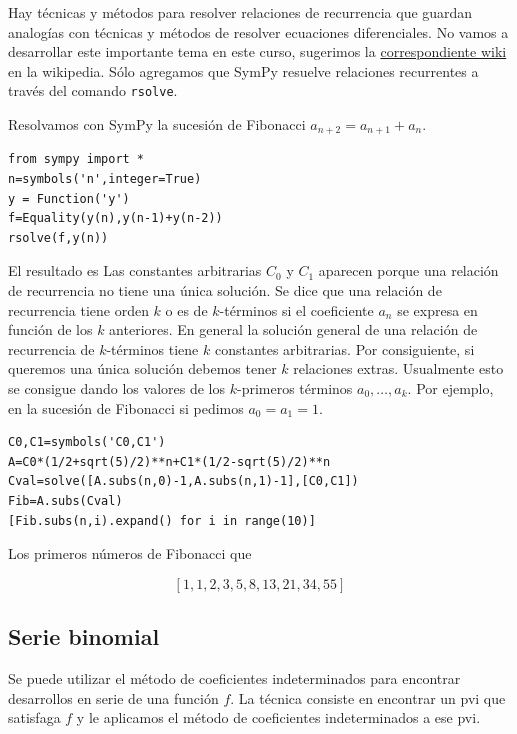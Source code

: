 Hay técnicas y métodos para resolver relaciones de recurrencia que guardan analogías con técnicas y métodos de resolver ecuaciones diferenciales.  No vamos a desarrollar este importante tema en este curso, sugerimos la \href{http://es.wikipedia.org/wiki/Relación_de_recurrencia}{correspondiente wiki} en la wikipedia. Sólo agregamos que  SymPy resuelve relaciones recurrentes a través del comando \texttt{rsolve}.

\begin{ejemplo}{} Resolvamos con SymPy la sucesión de Fibonacci $a_{n+2}=a_{n+1}+a_n$.
\begin{lstlisting}
from sympy import *
n=symbols('n',integer=True)
y = Function('y')
f=Equality(y(n),y(n-1)+y(n-2))
rsolve(f,y(n))
\end{lstlisting}

 El resultado es
Las constantes arbitrarias $C_0$ y $C_1$ aparecen porque una relación de recurrencia no tiene una única solución. Se dice que una relación de recurrencia tiene orden $k$ o es de $k$-términos si el coeficiente $a_n$ se expresa en función de los $k$  anteriores. En general la solución general de una relación de recurrencia de $k$-términos tiene $k$ constantes arbitrarias. Por consiguiente, si queremos una única solución debemos tener $k$ relaciones extras. Usualmente esto se consigue dando los valores de los $k$-primeros términos $a_0,\ldots,a_k$. Por ejemplo, en  la sucesión de Fibonacci si pedimos $a_0=a_1=1$.

\begin{lstlisting}
C0,C1=symbols('C0,C1')
A=C0*(1/2+sqrt(5)/2)**n+C1*(1/2-sqrt(5)/2)**n
Cval=solve([A.subs(n,0)-1,A.subs(n,1)-1],[C0,C1])
Fib=A.subs(Cval)
[Fib.subs(n,i).expand() for i in range(10)]
\end{lstlisting}


Los primeros números de Fibonacci que

\[ [1,1,2,3,5,8,13,21,34,55] \]

\end{ejemplo}

\subsection{Serie binomial}

 Se puede utilizar el método de coeficientes indeterminados para encontrar desarrollos en serie de una función  $f$. La técnica consiste en encontrar un pvi que satisfaga $f$ y le aplicamos el método de coeficientes indeterminados a ese pvi.

